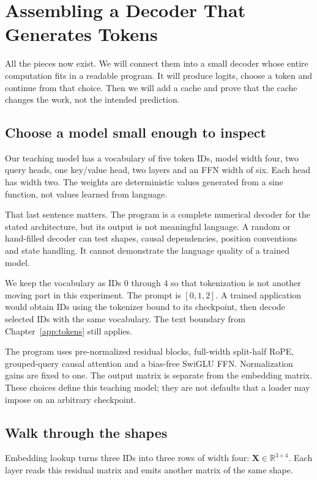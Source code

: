\chapter{Assembling a Decoder That Generates Tokens}\label{ch:decoder}
\begin{ChapterIntent}
All the pieces now exist. We will connect them into a small decoder whose
entire computation fits in a readable program. It will produce logits,
choose a token and continue from that choice. Then we will add a cache and
prove that the cache changes the work, not the intended prediction.
\end{ChapterIntent}

\section{Choose a model small enough to inspect}
Our teaching model has a vocabulary of five token IDs, model width four,
two query heads, one key/value head, two layers and an FFN width of six.
Each head has width two. The weights are deterministic values generated
from a sine function, not values learned from language.

That last sentence matters. The program is a complete numerical decoder
for the stated architecture, but its output is not meaningful language.
A random or hand-filled decoder can test shapes, causal dependencies,
position conventions and state handling. It cannot demonstrate the
language quality of a trained model.

We keep the vocabulary as IDs $0$ through $4$ so that tokenization is not
another moving part in this experiment. The prompt is $[0,1,2]$. A
trained application would obtain IDs using the tokenizer bound to its
checkpoint, then decode selected IDs with the same vocabulary. The text
boundary from Chapter~\ref{app:tokens} still applies.

The program uses pre-normalized residual blocks, full-width split-half
RoPE, grouped-query causal attention and a bias-free SwiGLU FFN.
Normalization gains are fixed to one. The output matrix is separate from
the embedding matrix. These choices define this teaching model; they are
not defaults that a loader may impose on an arbitrary checkpoint.

\section{Walk through the shapes}
Embedding lookup turns three IDs into three rows of width four:
$\mathbf X\in\mathbb R^{3\times4}$. Each layer reads this residual
matrix and emits another matrix of the same shape.

